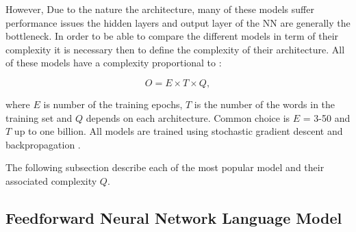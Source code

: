 However, Due to the nature the architecture, many of these models suffer
performance issues the hidden layers and output layer of the \ac{NN} are
generally the bottleneck.  In order to be able to compare the different
models in term of their complexity it is necessary then to define the
complexity of  their architecture. All of these models have a complexity proportional to 
\cite{DBLP:journals/corr/abs-1301-3781}:

\begin{center}
\begin{equation} O = E \times T \times Q,   \end{equation}
\end{center}

where $E$ is number of the training epochs, $T$ is the number of the words in
the training set and $Q$ depends on each architecture. Common choice is $E$ = 3-50 and $T$ up to one billion.
All models are trained using stochastic gradient descent and backpropagation
\cite{Bengio:2003:NPL:944919.944966}\cite{DBLP:journals/corr/abs-1301-3781}.

The following subsection describe each of the most popular  model and their
associated complexity $Q$.

\subsection{Feedforward Neural Network Language Model}
\label{subsec:fwd-neural-net-lm}


